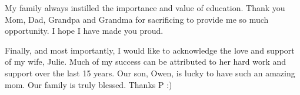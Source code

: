 My family always instilled the importance and value of education. Thank you Mom, Dad, Grandpa and Grandma for sacrificing to provide me so much opportunity. I hope I have made you proud.

Finally, and most importantly, I would like to acknowledge the love and support of my wife, Julie. Much of my success can be attributed to her hard work and support over the last 15 years. Our son, Owen, is lucky to have such an amazing mom. Our family is truly blessed. Thanks P :)

\clearpage %